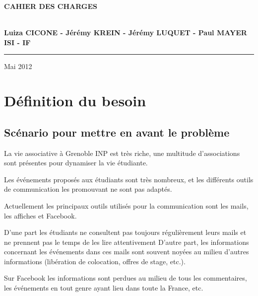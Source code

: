 \documentclass[a4paper, 11px]{article}
\begin{document}
\begin{titlepage}
\begin{center}
\begin{center}
{\Huge \bf CAHIER DES CHARGES}


\end{center}


\vspace{1cm}

\begin{center}
$ $\\
\large{ \textbf{Luiza CICONE - Jérémy KREIN - Jérémy LUQUET - Paul MAYER}}\\
\large{ \textbf{ISI - IF}}
$ $\\
\end{center}
\rule{\linewidth}{.5pt}


\vfill


{\large Mai 2012}

\end{center}
\end{titlepage}

\tableofcontents

\newpage


\section{Définition du besoin}

\subsection{Scénario pour mettre en avant le problème}

La vie associative à Grenoble INP est très riche, une multitude d'associations sont présentes pour dynamiser la vie étudiante.

Les événements proposés aux étudiants sont très nombreux, et les différents outils de communication les promouvant ne sont pas adaptés.

Actuellement les principaux outils utilisés pour la communication sont les mails, les affiches et Facebook.

D'une part les étudiants ne consultent pas toujours régulièrement leurs mails et ne prennent pas le temps de les lire attentivement D'autre part, les informations concernant les événements dans ces mails sont souvent noyées au milieu d'autres informations (libération de colocation, offres de stage, etc.).

Sur Facebook les informations sont perdues au milieu de tous les commentaires, les événements en tout genre ayant lieu dans toute la France, etc.
\end{document}
